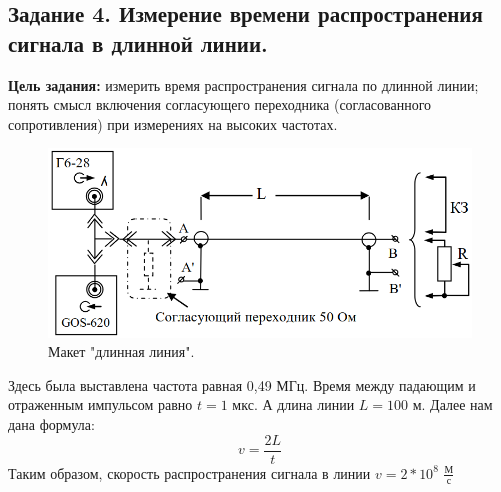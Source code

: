 \documentclass[a4paper,12pt]{article}
\begin{document}
\subsection{Задание 4. Измерение времени распространения
сигнала в длинной линии.}
\textbf{Цель задания:} измерить время распространения сигнала по длинной линии; понять смысл включения согласующего переходника (согласованного сопротивления) при измерениях на высоких частотах.
\begin{figure}[h!]
	\begin{center}
		\includegraphics[scale=0.6]{scheme_4.png}
	\end{center}
	\caption{Макет "длинная линия".}
\end{figure}

Здесь была выставлена частота равная 0,49 МГц. Время между падающим и отраженным импульсом равно $t = 1$ мкс. А длина линии $L = 100$ м.
Далее нам дана формула:
\begin{equation}
    v = \frac{2L}{t}
\end{equation}
Таким образом, скорость распространения сигнала в линии $v = 2*10^8$ $\frac{М}{с}$
\end{document}
